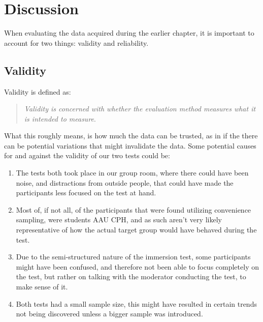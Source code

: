 \chapter{Discussion}
When evaluating the data acquired during the earlier chapter, it is important to account for two things: validity and reliability.
\section*{Validity}
	Validity is defined as:\\
	\begin{quote}
		\textit{Validity is concerned with whether the evaluation method measures what it is intended to measure}\cite{interactionDesign}.\\
	\end{quote}
	What this roughly means, is how much the data can be trusted, as in if the there can be potential variations that might invalidate the data. Some potential causes for and against the validity of our two tests could be:\\
	\begin{enumerate}
		\item The tests both took place in our group room, where there could have been noise, and distractions from outside people, that could have made the participants less focused on the test at hand.\\
		
		\item Most of, if not all, of the participants that were found utilizing convenience sampling, were students AAU CPH, and as such aren't very likely representative of how the actual target group would have behaved during the test.\\
		
		\item Due to the semi-structured nature of the immersion test, some participants might have been confused, and therefore not been able to focus completely on the test, but rather on talking with the moderator conducting the test, to make sense of it.\\
		
		\item Both tests had a small sample size, this might have resulted in certain trends not being discovered unless a bigger sample was introduced.\\
		
	\end{enumerate}
